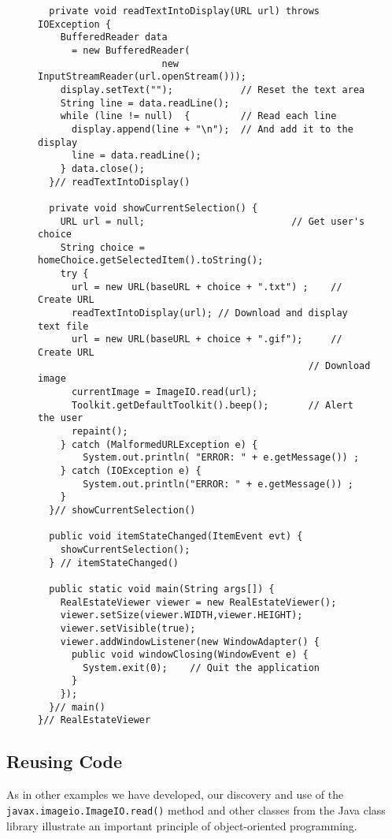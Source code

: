 {\begin{figure}[p]
\addtocounter{figure}{-1}
\jjjprogstart
\begin{jjjlisting}[30pc]
\begin{lstlisting}
  private void readTextIntoDisplay(URL url) throws IOException {
    BufferedReader data
      = new BufferedReader(
                      new InputStreamReader(url.openStream()));
    display.setText("");            // Reset the text area
    String line = data.readLine();
    while (line != null)  {         // Read each line
      display.append(line + "\n");  // And add it to the display
      line = data.readLine();
    } data.close();
  }// readTextIntoDisplay()

  private void showCurrentSelection() {
    URL url = null;                          // Get user's choice
    String choice = homeChoice.getSelectedItem().toString();     
    try {
      url = new URL(baseURL + choice + ".txt") ;    // Create URL
      readTextIntoDisplay(url); // Download and display text file
      url = new URL(baseURL + choice + ".gif");     // Create URL
                                                // Download image
      currentImage = ImageIO.read(url);
      Toolkit.getDefaultToolkit().beep();       // Alert the user
      repaint();
    } catch (MalformedURLException e) {
        System.out.println( "ERROR: " + e.getMessage()) ;
    } catch (IOException e) {
        System.out.println("ERROR: " + e.getMessage()) ;
    }
  }// showCurrentSelection()

  public void itemStateChanged(ItemEvent evt) {
    showCurrentSelection();
  } // itemStateChanged()

  public static void main(String args[]) {
    RealEstateViewer viewer = new RealEstateViewer();
    viewer.setSize(viewer.WIDTH,viewer.HEIGHT);
    viewer.setVisible(true);
    viewer.addWindowListener(new WindowAdapter() {     
      public void windowClosing(WindowEvent e) {
        System.exit(0);    // Quit the application
      }
    });
  }// main()
}// RealEstateViewer
\end{lstlisting}
\end{jjjlisting}
\end{figure}

\subsection{Reusing Code}
\noindent As in other examples we have developed, our discovery and use of the
{\tt javax.imageio.ImageIO.read()} method and other classes from the Java class
library illustrate an important principle of object-oriented
programming.

}
